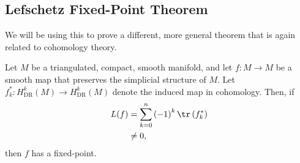 \documentclass[10pt]{mypackage}
\begin{document}
\subsection{Lefschetz Fixed-Point Theorem}%
We will be using this to prove a different, more general theorem that is again related to cohomology theory.
\begin{theorem}
  Let $M$ be a triangulated, compact, smooth manifold, and let $f\colon M\rightarrow M$ be a smooth map that preserves the simplicial structure of $M$. Let $f_k^{\ast}\colon H^k_{\operatorname{DR}}\left( M \right)\rightarrow H^{k}_{\operatorname{DR}}\left( M \right)$ denote the induced map in cohomology. Then, if
  \begin{align*}
    L(f) &= \sum_{k=0}^{n} \left( -1 \right)^{k} \tr\left( f_k^{\ast} \right)\\
         &\neq 0,
  \end{align*}
  then $f$ has a fixed-point.
\end{theorem}
\end{document}
